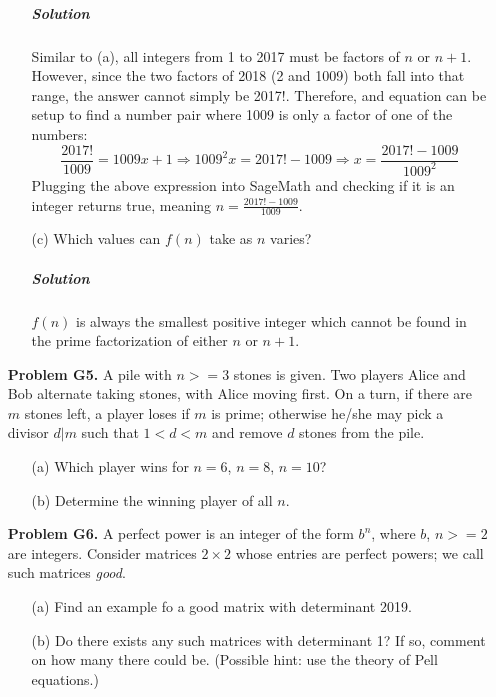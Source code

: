 \documentclass[10pt,a4paper]{article}
\newcommand{\mybox}{%
	\collectbox{%
		\setlength{\fboxsep}{3pt}%
		\fbox{\BOXCONTENT}%
	}%
}
\begin{document}
\begin{itemize}
\begin{enumerate}
			\subparagraph{Solution} Similar to (a), all integers from 1 to 2017 must be factors of $n$ or $n+1$. However, since the two factors of 2018 (2 and 1009) both fall into that range, the answer cannot simply be 2017!. Therefore, and equation can be setup to find a number pair where 1009 is only a factor of one of the numbers:
			\[ \frac{2017!}{1009}=1009x+1\Rightarrow 1009^2x=2017!-1009\Rightarrow x=\frac{2017!-1009}{1009^2} \]
			Plugging the above expression into SageMath and checking if it is an integer returns true, meaning \mybox{$n=\frac{2017!-1009}{1009}$}.
			
			\item[(c)] Which values can $f(n)$ take as $n$ varies?
			
			\subparagraph{Solution} $f(n)$ is always the smallest positive integer which cannot be found in the prime factorization of either $n$ or $n+1$.
		\end{enumerate}
	
		\item[\textbf{Problem G5.}] A pile with $n>=3$ stones is given. Two players Alice and Bob alternate taking stones, with Alice moving first. On a turn, if there are $m$ stones left, a player loses if $m$ is prime; otherwise he/she may pick a divisor $d | m$ such that $1<d<m$ and remove $d$ stones from the pile.
		
		\begin{enumerate}
			\item[(a)] Which player wins for $n=6$, $n=8$, $n=10$?
			
			\item[(b)] Determine the winning player of all $n$.
		\end{enumerate}
	
		\item[\textbf{Problem G6.}] A perfect power is an integer of the form $b^n$, where $b$, $n>=2$ are integers. Consider matrices $2\times2$ whose entries are perfect powers; we call such matrices \textit{good}.
		
		\begin{enumerate}
			\item[(a)] Find an example fo a good matrix with determinant 2019.
			
			\item[(b)] Do there exists any such matrices with determinant 1? If so, comment on how many there could be. (Possible hint: use the theory of Pell equations.)
		\end{enumerate}
	

\end{itemize}
\end{document}
